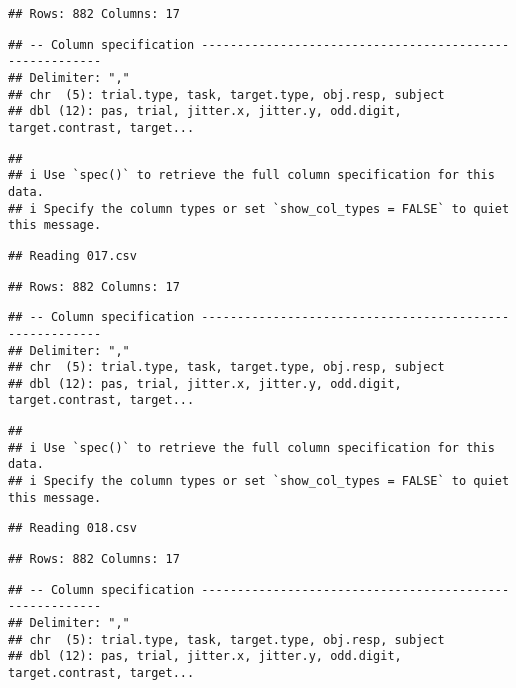 \documentclass[
]{article}
\begin{document}
\begin{verbatim}
## Rows: 882 Columns: 17
\end{verbatim}

\begin{verbatim}
## -- Column specification --------------------------------------------------------
## Delimiter: ","
## chr  (5): trial.type, task, target.type, obj.resp, subject
## dbl (12): pas, trial, jitter.x, jitter.y, odd.digit, target.contrast, target...
\end{verbatim}

\begin{verbatim}
## 
## i Use `spec()` to retrieve the full column specification for this data.
## i Specify the column types or set `show_col_types = FALSE` to quiet this message.
\end{verbatim}

\begin{verbatim}
## Reading 017.csv
\end{verbatim}

\begin{verbatim}
## Rows: 882 Columns: 17
\end{verbatim}

\begin{verbatim}
## -- Column specification --------------------------------------------------------
## Delimiter: ","
## chr  (5): trial.type, task, target.type, obj.resp, subject
## dbl (12): pas, trial, jitter.x, jitter.y, odd.digit, target.contrast, target...
\end{verbatim}

\begin{verbatim}
## 
## i Use `spec()` to retrieve the full column specification for this data.
## i Specify the column types or set `show_col_types = FALSE` to quiet this message.
\end{verbatim}

\begin{verbatim}
## Reading 018.csv
\end{verbatim}

\begin{verbatim}
## Rows: 882 Columns: 17
\end{verbatim}

\begin{verbatim}
## -- Column specification --------------------------------------------------------
## Delimiter: ","
## chr  (5): trial.type, task, target.type, obj.resp, subject
## dbl (12): pas, trial, jitter.x, jitter.y, odd.digit, target.contrast, target...
\end{verbatim}
\end{document}
